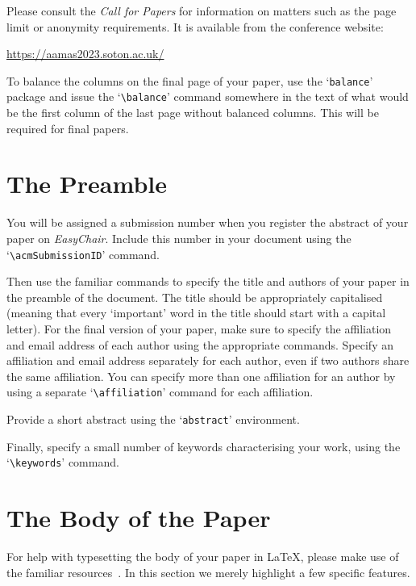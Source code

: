 \documentclass[sigconf]{aamas}
\begin{document}
Please consult the \emph{Call for Papers} for information on matters 
such as the page limit or anonymity requirements. It is available from
the conference website:
%
\begin{center}
\url{https://aamas2023.soton.ac.uk/}   
\end{center}
%
To balance the columns on the final page of your paper, use the 
`\texttt{balance}' package and issue the `\verb|\balance|' command
 somewhere in the text of what would be the first column of the last 
 page without balanced columns. This will be required for final papers.


\section{The Preamble}

You will be assigned a submission number when you register the abstract 
of your paper on \textit{EasyChair}. Include this number in your 
document using the `\verb|\acmSubmissionID|' command.

Then use the familiar commands to specify the title and authors of your
paper in the preamble of the document. The title should be appropriately 
capitalised (meaning that every `important' word in the title should 
start with a capital letter). For the final version of your paper, make 
sure to specify the affiliation and email address of each author using 
the appropriate commands. Specify an affiliation and email address 
separately for each author, even if two authors share the same 
affiliation. You can specify more than one affiliation for an author by 
using a separate `\verb|\affiliation|' command for each affiliation.

Provide a short abstract using the `\texttt{abstract}' environment.
 
Finally, specify a small number of keywords characterising your work, 
using the `\verb|\keywords|' command. 


\section{The Body of the Paper}

For help with typesetting the body of your paper in \LaTeX\@, please 
make use of the familiar resources~\cite{Lam94}. In this section we 
merely highlight a few specific features. 
\end{document}
